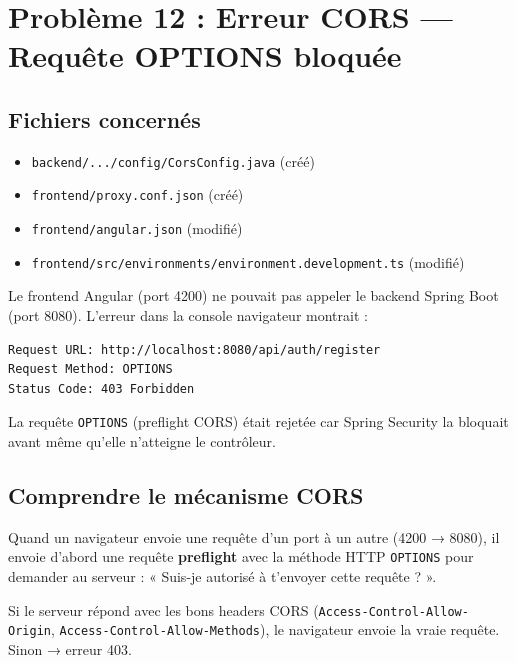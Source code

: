 \documentclass[a4paper,12pt,french]{article}
\begin{document}
\newpage

\section{Problème 12 : Erreur CORS — Requête OPTIONS bloquée}

\subsection{Fichiers concernés}
\begin{itemize}
    \item \texttt{backend/.../config/CorsConfig.java} (créé)
    \item \texttt{frontend/proxy.conf.json} (créé)
    \item \texttt{frontend/angular.json} (modifié)
    \item \texttt{frontend/src/environments/environment.development.ts} (modifié)
\end{itemize}

\begin{problembox}
Le frontend Angular (port 4200) ne pouvait pas appeler le backend Spring Boot (port 8080). L'erreur dans la console navigateur montrait :

\begin{lstlisting}[style=bashstyle]
Request URL: http://localhost:8080/api/auth/register
Request Method: OPTIONS
Status Code: 403 Forbidden
\end{lstlisting}

La requête \texttt{OPTIONS} (preflight CORS) était rejetée car Spring Security la bloquait avant même qu'elle n'atteigne le contrôleur.
\end{problembox}

\subsection{Comprendre le mécanisme CORS}

Quand un navigateur envoie une requête d'un port à un autre (4200 → 8080), il envoie d'abord une requête \textbf{preflight} avec la méthode HTTP \texttt{OPTIONS} pour demander au serveur : « Suis-je autorisé à t'envoyer cette requête ? ».

Si le serveur répond avec les bons headers CORS (\texttt{Access-Control-Allow-Origin}, \texttt{Access-Control-Allow-Methods}), le navigateur envoie la vraie requête. Sinon → erreur 403.
\end{document}

